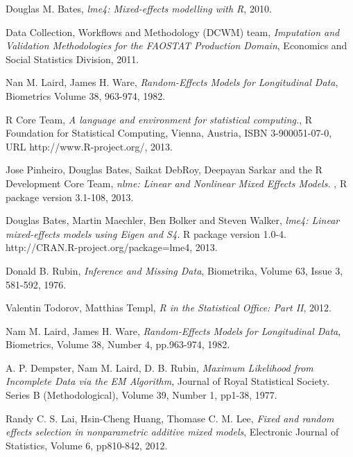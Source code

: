 \documentclass[nojss]{jss}\usepackage[]{graphicx}\usepackage[]{color}
\begin{document}
\begin{thebibliography}{11}
  Douglas M. Bates,
  \emph{lme4: Mixed-effects modelling with R},
  2010.
  
  Data Collection, Workflows and Methodology (DCWM) team,
  \emph{Imputation and Validation Methodologies for the FAOSTAT Production Domain},
  Economics and Social Statistics Division,
  2011.
  
  Nan M. Laird, James H. Ware,
  \emph{Random-Effects Models for Longitudinal Data},
  Biometrics Volume 38, 963-974,
  1982.
  
  R Core Team,
  \emph{A language and environment for statistical computing.},
  R Foundation for Statistical Computing, Vienna, Austria,
  ISBN 3-900051-07-0, URL http://www.R-project.org/,
  2013.
  
  Jose Pinheiro, Douglas Bates, Saikat DebRoy, Deepayan Sarkar and the
  R Development Core Team,
  \emph{nlme: Linear and Nonlinear Mixed Effects Models.} ,
  R package version 3.1-108,
  2013.

  Douglas Bates, Martin Maechler, Ben Bolker and Steven Walker,
  \emph{lme4: Linear mixed-effects models using Eigen and S4.} 
  R package version 1.0-4. http://CRAN.R-project.org/package=lme4,
  2013.
 
  Donald B. Rubin,
  \emph{Inference and Missing Data},
  Biometrika, Volume 63, Issue 3, 581-592,
  1976.
  
  Valentin Todorov, Matthias Templ,
  \emph{R in the Statistical Office: Part II},
  2012.
  
  Nam M. Laird, James H. Ware,
  \emph{Random-Effects Models for Longitudinal Data},
  Biometrics, Volume 38, Number 4, pp.963-974,
  1982.

  A. P. Dempster, Nam M. Laird, D. B. Rubin,
  \emph{Maximum Likelihood from Incomplete Data via the EM Algorithm},
  Journal of Royal Statistical Society. Series B (Methodological), Volume 39, Number 1, pp1-38,
  1977.
  
  Randy C. S. Lai, Hsin-Cheng Huang, Thomase C. M. Lee,
  \emph{Fixed and random effects selection in nonparametric additive mixed models},
  Electronic Journal of Statistics, Volume 6, pp810-842,
  2012.
\end{thebibliography}
  
\end{document}

